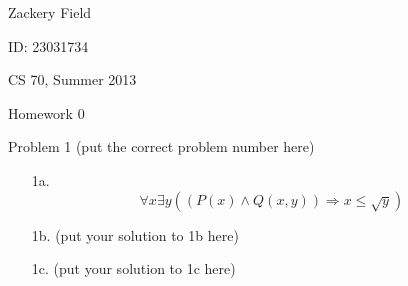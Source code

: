 \documentclass[11pt,letterpaper]{article}
\begin{document}
Zackery Field

ID: 23031734

CS 70, Summer 2013

Homework 0 

Problem 1 (put the correct problem number here)
\bigskip

\begin{enumerate}
\item[1a.] 
\[ \forall x \exists y ((P(x) \wedge Q(x,y)) \Longrightarrow x \leq \sqrt{y})  \]


\item[1b.] (put your solution to 1b here)

\item[1c.] (put your solution to 1c here)

\end{enumerate}
\end{document}
